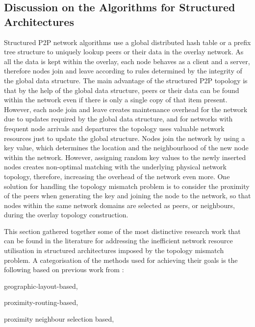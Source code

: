 \subsection{Discussion on the Algorithms for Structured Architectures}
Structured P2P network algorithms use a global distributed hash table or a
prefix tree structure to uniquely lookup peers or their data in the overlay
network. As all the data is kept within the overlay, each node behaves as a
client and a server, therefore nodes join and leave according to rules
determined by the integrity of the global data structure. The main advantage of
the structured P2P topology is that by the help of the global data structure,
peers or their data can be found within the network even if there is only a
single copy of that item present. However, each node join and leave creates
maintenance overhead for the network due to updates required by the global data
structure, and for networks with frequent node arrivals and departures the
topology uses valuable network resources just to update the global structure.
Nodes join the network by using a key value, which determines the location and
the neighbourhood of the new node within the network. However, assigning
random key values to the newly inserted nodes creates non-optimal matching with
the underlying physical network topology, therefore, increasing the overhead of
the network even more. One solution for handling the topology mismatch problem
is to consider the proximity of the peers when generating the key and joining
the node to the network, so that nodes within the same network domains are
selected as peers, or neighbours, during the overlay topology construction.

This section gathered together some of the most distinctive research work that
can be found in the literature for addressing the inefficient network resource
utilisation in structured architectures imposed by the topology mismatch
problem. A categorisation of the methods used for achieving their goals is the
following based on previous work from
\cite{CDHR2002,CDCR2002,RSS2002}:
\begin{inparaenum}
  \item geographic-layout-based,
  \item proximity-routing-based,
  \item proximity neighbour selection based,
\end{inparaenum}

